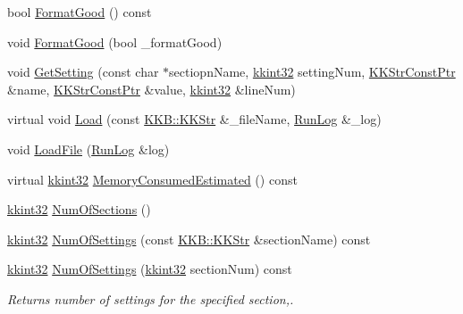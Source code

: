 \begin{DoxyCompactItemize}
\item 
bool \hyperlink{class_k_k_b_1_1_configuration_a83da17732beb6179d42f73f699795b68}{Format\+Good} () const 
\item 
void \hyperlink{class_k_k_b_1_1_configuration_ace46502cc01f162bcdae4dee0531a04b}{Format\+Good} (bool \+\_\+format\+Good)
\item 
void \hyperlink{class_k_k_b_1_1_configuration_abe8bbd2f858281ff44eccfac2a08477e}{Get\+Setting} (const char $\ast$sectiopn\+Name, \hyperlink{namespace_k_k_b_a8fa4952cc84fda1de4bec1fbdd8d5b1b}{kkint32} setting\+Num, \hyperlink{namespace_k_k_b_a46f665ec17615c856eff3d21f78bed5c}{K\+K\+Str\+Const\+Ptr} \&name, \hyperlink{namespace_k_k_b_a46f665ec17615c856eff3d21f78bed5c}{K\+K\+Str\+Const\+Ptr} \&value, \hyperlink{namespace_k_k_b_a8fa4952cc84fda1de4bec1fbdd8d5b1b}{kkint32} \&line\+Num)
\item 
virtual void \hyperlink{class_k_k_b_1_1_configuration_ad7d2e6b0148c6db8362abc6688a71739}{Load} (const \hyperlink{class_k_k_b_1_1_k_k_str}{K\+K\+B\+::\+K\+K\+Str} \&\+\_\+file\+Name, \hyperlink{class_k_k_b_1_1_run_log}{Run\+Log} \&\+\_\+log)
\item 
void \hyperlink{class_k_k_b_1_1_configuration_a3e7ae9b1d1f07f240fcea975fb8deea8}{Load\+File} (\hyperlink{class_k_k_b_1_1_run_log}{Run\+Log} \&log)
\item 
virtual \hyperlink{namespace_k_k_b_a8fa4952cc84fda1de4bec1fbdd8d5b1b}{kkint32} \hyperlink{class_k_k_b_1_1_configuration_a494a09ab9d70eee0855079da512e7293}{Memory\+Consumed\+Estimated} () const 
\item 
\hyperlink{namespace_k_k_b_a8fa4952cc84fda1de4bec1fbdd8d5b1b}{kkint32} \hyperlink{class_k_k_b_1_1_configuration_ab0f4ec3df333ac45eebf4b3bc4b72477}{Num\+Of\+Sections} ()
\item 
\hyperlink{namespace_k_k_b_a8fa4952cc84fda1de4bec1fbdd8d5b1b}{kkint32} \hyperlink{class_k_k_b_1_1_configuration_aa7cc05562fce75eb8c720bba45980559}{Num\+Of\+Settings} (const \hyperlink{class_k_k_b_1_1_k_k_str}{K\+K\+B\+::\+K\+K\+Str} \&section\+Name) const 
\item 
\hyperlink{namespace_k_k_b_a8fa4952cc84fda1de4bec1fbdd8d5b1b}{kkint32} \hyperlink{class_k_k_b_1_1_configuration_a9914f5ba6c1278a988af4fcd011d58a1}{Num\+Of\+Settings} (\hyperlink{namespace_k_k_b_a8fa4952cc84fda1de4bec1fbdd8d5b1b}{kkint32} section\+Num) const 
\begin{DoxyCompactList}\small\item\em Returns number of settings for the specified section,. \end{DoxyCompactList}\item 

\end{DoxyCompactItemize}
